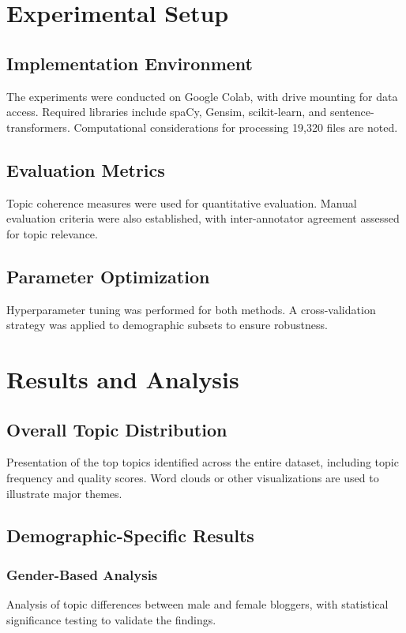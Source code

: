 \documentclass[conference]{IEEEtran}
\begin{document}
\section{Experimental Setup}
\subsection{Implementation Environment}
The experiments were conducted on Google Colab, with drive mounting for data access. Required libraries include spaCy, Gensim, scikit-learn, and sentence-transformers. Computational considerations for processing 19,320 files are noted.

\subsection{Evaluation Metrics}
Topic coherence measures were used for quantitative evaluation. Manual evaluation criteria were also established, with inter-annotator agreement assessed for topic relevance.

\subsection{Parameter Optimization}
Hyperparameter tuning was performed for both methods. A cross-validation strategy was applied to demographic subsets to ensure robustness.

\section{Results and Analysis}
\subsection{Overall Topic Distribution}
Presentation of the top topics identified across the entire dataset, including topic frequency and quality scores. Word clouds or other visualizations are used to illustrate major themes.

\subsection{Demographic-Specific Results}
\subsubsection{Gender-Based Analysis}
Analysis of topic differences between male and female bloggers, with statistical significance testing to validate the findings.
\end{document}
